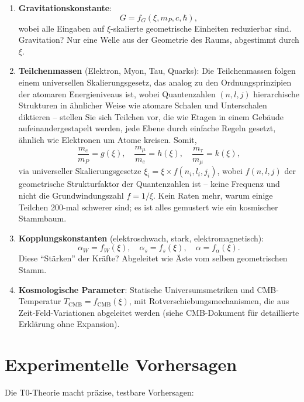 	\begin{enumerate}
		\item \textbf{Gravitationskonstante}:
		\[
		G = f_G(\xi, m_P, c, \hbar),
		\]
		wobei alle Eingaben auf $\xi$-skalierte geometrische Einheiten reduzierbar sind. Gravitation? Nur eine Welle aus der Geometrie des Raums, abgestimmt durch $\xi$.
		
		\item \textbf{Teilchenmassen} (Elektron, Myon, Tau, Quarks):
		Die Teilchenmassen folgen einem universellen Skalierungsgesetz, das analog zu den Ordnungsprinzipien der atomaren Energieniveaus ist, wobei Quantenzahlen $(n, l, j)$ hierarchische Strukturen in ähnlicher Weise wie atomare Schalen und Unterschalen diktieren – stellen Sie sich Teilchen vor, die wie Etagen in einem Gebäude aufeinandergestapelt werden, jede Ebene durch einfache Regeln gesetzt, ähnlich wie Elektronen um Atome kreisen. Somit,
		\[
		\frac{m_e}{m_P} = g(\xi), \quad \frac{m_\mu}{m_e} = h(\xi), \quad \frac{m_\tau}{m_\mu} = k(\xi),
		\]
		via universeller Skalierungsgesetze $\xi_i = \xi \times f(n_i, l_i, j_i)$, wobei $f(n,l,j)$ der geometrische Strukturfaktor der Quantenzahlen ist -- keine Frequenz und nicht die Grundwindungszahl $f = 1/\xi$. Kein Raten mehr, warum einige Teilchen 200-mal schwerer sind; es ist alles gemustert wie ein kosmischer Stammbaum.
		
		\item \textbf{Kopplungskonstanten} (elektroschwach, stark, elektromagnetisch):
		\[
		\alpha_W = f_W(\xi), \quad \alpha_s = f_s(\xi), \quad \alpha = f_\alpha(\xi).
		\]
		Diese ``Stärken'' der Kräfte? Abgeleitet wie Äste vom selben geometrischen Stamm.
		
		\item \textbf{Kosmologische Parameter}:
		Statische Universumsmetriken und CMB-Temperatur $T_{\text{CMB}} = f_{\text{CMB}}(\xi)$, mit Rotverschiebungsmechanismen, die aus Zeit-Feld-Variationen abgeleitet werden (siehe CMB-Dokument für detaillierte Erklärung ohne Expansion).
	\end{enumerate}

	\section{Experimentelle Vorhersagen}
	
	Die T0-Theorie macht präzise, testbare Vorhersagen:
	
